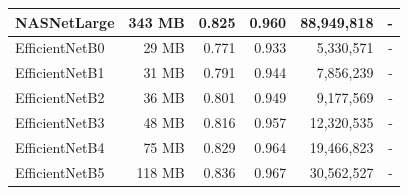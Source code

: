 \begin{table}[h!]
\begin{tabular}{|l|r|r|r|r|r|}
    NASNetLarge                                                  & 343 MB                             & 0.825                                                                                   & 0.960                                                                                   & 88,949,818                               & -                                   \\ \hline
    EfficientNetB0                                               & 29 MB                              & 0.771                                                                                   & 0.933                                                                                   & 5,330,571                                & -                                   \\ \hline
    EfficientNetB1                                               & 31 MB                              & 0.791                                                                                   & 0.944                                                                                   & 7,856,239                                & -                                   \\ \hline
    EfficientNetB2                                               & 36 MB                              & 0.801                                                                                   & 0.949                                                                                   & 9,177,569                                & -                                   \\ \hline
    EfficientNetB3                                               & 48 MB                              & 0.816                                                                                   & 0.957                                                                                   & 12,320,535                               & -                                   \\ \hline
    EfficientNetB4                                               & 75 MB                              & 0.829                                                                                   & 0.964                                                                                   & 19,466,823                               & -                                   \\ \hline
    EfficientNetB5                                               & 118 MB                             & 0.836                                                                                   & 0.967                                                                                   & 30,562,527                               & -                                   \\ \hline

\end{tabular}
\end{table}
